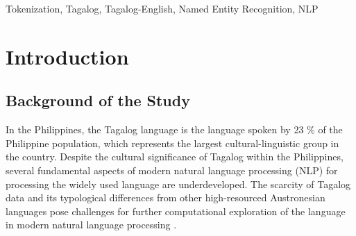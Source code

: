 \documentclass[journal]{./IEEE/IEEEtran}
\title{\SPTITLE}
\author{\ADVISEE~and~\ADVISER%
\REMARK
}
\begin{document}
\maketitle

\begin{abstract}
Tokenization is a critical preprocessing step in many natural language processing (NLP) tasks, yet most general tokenization methods do not effectively recognize the unique grammatical features, named entities (NEs), and multi-word expressions (MWEs) of a language. These issues are more evident for low-resource languages, including the Tagalog language, which is further complicated by code-switching. Thus, this study introduces PANG-KAT, a hybrid rule and dictionary-based tokenizer dedicated to Tagalog that is designed to handle these aforementioned challenges for both short- and long-term unit tokenization. Performance evaluation results indicate good performance with F1 scores of 0.9518 and 0.9130 on News-PH NLI dataset and F1 scores of 0.9624 and 0.9411 on articles from Pilipino Star Ngayon (May 2025) for short and longer unit tokenization, respectively. These results affirm the effectiveness of its rule set and dictionaries in capturing the patterns in Tagalog and Taglish texts.
\end{abstract}

\begin{keywords}
Tokenization, Tagalog, Tagalog-English, Named Entity Recognition, NLP
\end{keywords}

\section{Introduction}

\subsection{Background of the Study}

In the Philippines, the Tagalog language is the language spoken by 23 \% of the Philippine population, which represents the largest cultural-linguistic group in the country. Despite the cultural significance of Tagalog within the Philippines, several fundamental aspects of modern natural language processing (NLP) for processing the widely used language are underdeveloped. The scarcity of Tagalog data and its typological differences from other high-resourced Austronesian languages pose challenges for further computational exploration of the language in modern natural language processing {\cite{TweetTaglish}}. \\
\end{document}
